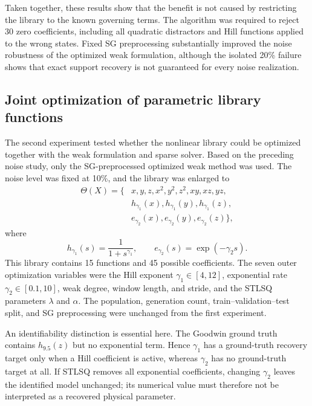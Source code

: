 Taken together, these results show that the benefit is not caused by restricting
the library to the known governing terms.  The algorithm was required to reject
30 zero coefficients, including all quadratic distractors and Hill functions
applied to the wrong states.  Fixed SG preprocessing substantially improved the
noise robustness of the optimized weak formulation, although the isolated
20\% failure shows that exact support recovery is not guaranteed for every
noise realization.

\subsection{Joint optimization of parametric library functions}
\label{sec:results-goodwin-parametric}

The second experiment tested whether the nonlinear library could be optimized
together with the weak formulation and sparse solver.  Based on the preceding
noise study, only the SG-preprocessed optimized weak method was used.  The
noise level was fixed at 10\%, and the library was enlarged to
\begin{equation}
\begin{split}
\Theta(X)=\{&x,y,z,x^2,y^2,z^2,xy,xz,yz,\\
&h_{\gamma_1}(x),h_{\gamma_1}(y),h_{\gamma_1}(z),\\
&e_{\gamma_2}(x),e_{\gamma_2}(y),e_{\gamma_2}(z)\},
\end{split}
\label{eq:figure3-library}
\end{equation}
where
\begin{equation}
    h_{\gamma_1}(s)=\frac{1}{1+s^{\gamma_1}},
    \qquad
    e_{\gamma_2}(s)=\exp(-\gamma_2 s).
\end{equation}
This library contains 15 functions and 45 possible coefficients.  The seven
outer optimization variables were the Hill exponent
$\gamma_1\in[4,12]$, exponential rate $\gamma_2\in[0.1,10]$, weak
degree, window length, and stride, and the STLSQ parameters $\lambda$ and
$\alpha$.  The population, generation count, train--validation--test split,
and SG preprocessing were unchanged from the first experiment.

An identifiability distinction is essential here.  The Goodwin ground truth
contains $h_{9.5}(z)$ but no exponential term.  Hence $\gamma_1$ has a
ground-truth recovery target only when a Hill coefficient is active, whereas
$\gamma_2$ has no ground-truth target at all.  If STLSQ removes all exponential
coefficients, changing $\gamma_2$ leaves the identified model unchanged; its
numerical value must therefore not be interpreted as a recovered physical
parameter.

